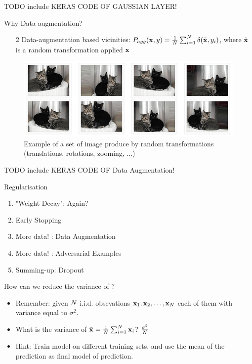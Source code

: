 \documentclass[xcolor=pdftex,dvipsnames,table,mathserif]{beamer}
\begin{document}
\begin{frame}
TODO include KERAS CODE OF GAUSSIAN LAYER!
\end{frame}

\begin{frame}{Why Data-augmentation?}
\begin{enumerate}
\item[2]  Data-augmentation based vicinities: $P_{agg}(\mathbf{x},y) = \frac{1}{N}\sum_{i=1}^{N}\delta(\tilde{\mathbf{x}},y_i)$, where $\tilde{\mathbf{x}}$ is a random transformation applied $\mathbf{x}$
\end{enumerate}
\begin{figure}
\includegraphics[width=.99 \columnwidth]{../graphics/cat_data_augmentation}
\caption{Example of a set of image produce by random transformations (translations, rotations, zooming, ...)}
\end{figure}
\end{frame}

\begin{frame}
TODO include KERAS CODE OF Data Augmentation!
\end{frame}

\begin{frame}{Regularisation}
\begin{enumerate}
\item "Weight Decay": Again?
\item Early Stopping
\item More data! : Data Augmentation
\item More data!  : Adversarial Examples
\item Summing-up: Dropout
\end{enumerate}
\end{frame}

\begin{frame}{How can we reduce the variance of ?}
\begin{itemize}
\item Remember: given $N$ i.i.d. obsevations $\mathbf{x}_1,\mathbf{x}_2,\ldots,\mathbf{x}_N$ each of them with variance equal to $\sigma^2$. 
\item What is the variance of $\bar{\mathbf{x}}=\frac{1}{N} \sum_{i=1}^{N} \mathbf{x}_i $? \pause $\frac{\sigma^2}{N}$
\item Hint: Train model on different training sets, and use the mean of the prediction as final model of prediction.
\end{itemize}
\end{frame}
\end{document}

